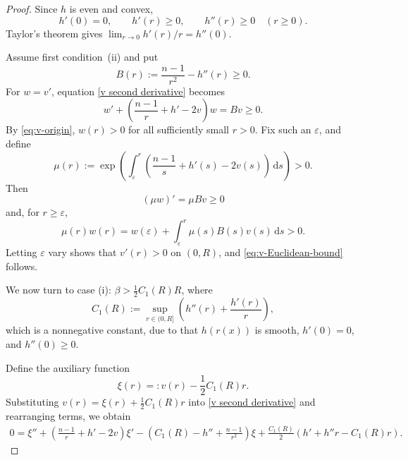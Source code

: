\documentclass[10pt,a4paper]{amsart}
\newcommand{\dd}{\,\mathrm d}
\begin{document}
\begin{proof}
Since \(h\) is even and convex,
\[
h'(0)=0,\qquad h'(r)\geq0,\qquad h''(r)\geq0
\quad(r\geq0).
\]
Taylor's theorem gives
\(\displaystyle\lim_{r\to 0}h'(r)/r=h''(0)\).


Assume first condition~\textup{(ii)} and put
\[
B(r):=\frac{n-1}{r^2}-h''(r)\geq0.
\]
For \(w=v'\), equation
\eqref{v second derivative} becomes
\[
w'+\left(\frac{n-1}{r}+h'-2v\right)w=Bv\geq0.
\]
By \eqref{eq:v-origin}, \(w(r)>0\) for all sufficiently small
\(r>0\).  Fix such an \(\varepsilon\), and define
\[
\mu(r):=
\exp\left(
\int_\varepsilon^r
\left(\frac{n-1}{s}+h'(s)-2v(s)\right)\dd s
\right)>0.
\]
Then
\[
(\mu w)'=\mu Bv\geq0
\]
and, for \(r\geq\varepsilon\),
\[
\mu(r)w(r)
=
w(\varepsilon)+\int_\varepsilon^r\mu(s)B(s)v(s)\dd s>0.
\]
Letting \(\varepsilon\) vary shows that \(v'(r)>0\) on \((0,R)\),
and \eqref{eq:v-Euclidean-bound} follows.

We now turn to case (i):
 $\beta >\frac 1 2 C_1(R) R$, where
 $$C_1(R):= \sup_{r\in (0,R]} \left(h''(r) + \frac{h'(r)}{r}\right), $$
 which is a nonnegative constant, due to  that $h(r(x))$ is smooth,  $h'(0)=0$, and $h''(0)\ge 0$.
 
Define the auxiliary function $$\xi(r) = : v(r) - \frac 1 2 C_1(R) r.$$   Substituting   $v(r) = \xi(r) + \frac 1 2 C_1(R) r$ into \eqref{v second derivative} and rearranging terms, we obtain
\begin{align}\label{4.5}   
0 = \xi'' + \left(\frac{n-1}{r}+h'-2v\right)\xi' - \left(C_1(R)-h''+\frac{n-1}{r^{2}}\right)\xi + \frac{C_1(R)}{2}\left(h'+h''r-C_1(R)r\right).
\end{align}


\end{proof}
\end{document}

